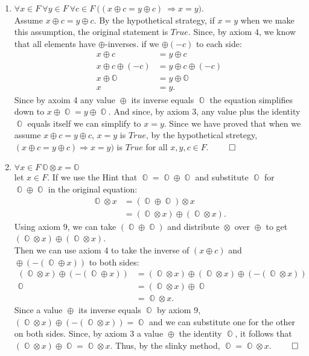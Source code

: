 \documentclass[11pt]{article}
\numberwithin{equation}{section}
\DeclareMathOperator*{\OO}{\mathbb{O}}
\DeclareMathOperator*{\+}{\oplus}
\DeclareMathOperator*{\x}{\otimes}
\begin{document}
\begin{enumerate}[label= 1.\arabic*), itemsep=0.4cm]
  \item %
    $\forall x \in F \ \forall y \in F \ \forall c \in F \ \Big ( (x \oplus c = y \oplus c) \ \Rightarrow x=y \Big ) $. \\
    Assume $x \oplus c = y \oplus c$. By the hypothetical strategy, if $x=y$ when we make this assumption, the original statement is $True$. Since, by axiom 4, we know that all elements have $\oplus$-inverses. if we $\oplus (-c)$ to each side:
    \begin{align*}
      x \oplus c &= y \oplus c\\
      x \oplus c \oplus (-c) &= y \oplus c \oplus (-c)\\
      x \oplus \mathbb{O} &= y \oplus \mathbb{O}\\
      x  &= y.
    \end{align*}
    Since by axoim 4 any value $\+$ its inverse equals $\OO$ the equation simplifies down to $x \+ \OO = y \+\OO$. And since, by axiom 3, any value plus the identity $\OO$ equals itself we can simplify to $x = y$. Since we have proved that when we assume $x \+ c = y \+ c$, $x=y$ is $True$, by the hypothetical stretegy, $(x \+ c = y \+ c) \Rightarrow x = y)$ is $True$ for all $x,y,c \in F$. $\qed$
      
  \item %
    $\forall x \in F \ \mathbb{O} \otimes x = \mathbb{O}$\\
    let $x \in F$. If we use the Hint that $\OO = \OO \+ \OO$ and substitute $\OO$ for $\OO \+ \OO$ in the original equation: 
    \begin{align*}
      \OO \x x &= (\OO \+ \OO) \x x \\
             &= (\OO \x x)\+ (\OO \x x).%
    \end{align*} 
    Using axiom 9, we can take $(\OO \+ \OO)$ and distribute $\x$ over $\+$ to get $(\OO \x x) \+ (\OO \x x)$.\\
    Then we can use axiom 4 to take the inverse of $(x \+ c)$ and $\+ (-(\OO\+ x))$ to both sides:
    \begin{align*}
      (\OO \x x) \+ (-(\OO \+ x)) &= 
              (\OO \x x)\+(\OO\x x)\+(-(\OO\x x))\\
      \OO &= (\OO \x x)\+ \OO\\
         &= \OO \x x.
    \end{align*}
    Since a value $\+$ its inverse equals $\OO$ by axiom 9, $(\OO \x x ) \+ (-(\OO \x x)) = \OO$ and we can substitute one for the other on both sides. Since, by axiom 3 a value $\+$ the identity $\OO$, it follows that $(\OO \x x) \+ \OO = \OO \x x$. Thus, by the slinky method, $\OO = \OO \x x$. $\qed$



\end{enumerate}
\end{document}
